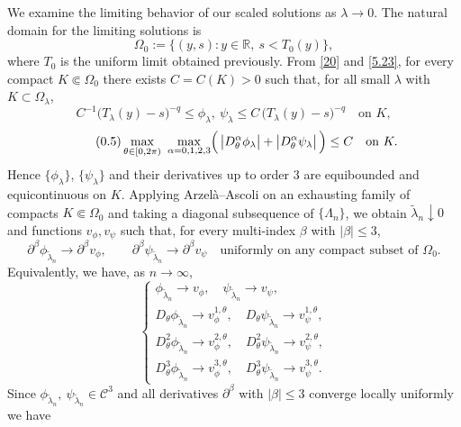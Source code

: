 \documentclass[
  sn-mathphys-num,
  colorlinks,
  linkcolor=darkmagenta,
  citecolor=rufous,
  urlcolor=zaffre,
  hypertexnames=false
]{sn-jnl}
\numberwithin{equation}{section}
\begin{document}
\medskip
We  examine the limiting behavior of our scaled solutions as \(\lambda \to 0\).
The natural domain for the limiting solutions is
$$
\Omega_0 := \{(y,s) : y \in \mathbb{R},\ s < T_0(y)\},
$$
where \(T_0\) is the uniform limit obtained previously.
\medskip
 From \eqref{20} and \eqref{5.23}, for every compact $K\Subset \Omega_0$ there exists $C=C(K)>0$ such that, for all small $\lambda$ with $K\subset \Omega_\lambda$,
\begin{equation}\tag{0.4}
C^{-1}\bigl(T_\lambda(y)-s\bigr)^{-q}\le \phi_\lambda,\ \psi_\lambda \le
C\,\bigl(T_\lambda(y)-s\bigr)^{-q}\quad \text{on }K,
\end{equation}
\begin{equation}\tag{0.5}
\max_{\theta\in[0,2\pi)}\ \max_{\alpha=0,1,2,3}
\Bigl(\,\bigl|D_\theta^{\alpha}\phi_\lambda\bigr|+\bigl|D_\theta^{\alpha}\psi_\lambda\bigr|\,\Bigr)\le C
\quad \text{on }K.
\end{equation}
Hence $\{\phi_\lambda\}$, $\{\psi_\lambda\}$ and their derivatives up to order $3$ are equibounded and equicontinuous on $K$. Applying Arzelà--Ascoli on an exhausting family of compacts $K\Subset \Omega_0$ and taking a diagonal subsequence of $\{\Lambda_n\}$, we obtain $\tilde\lambda_n\downarrow 0$ and functions $v_\phi, v_\psi$ such that, for every multi-index $\beta$ with $|\beta|\le 3$,
\begin{equation}\tag{0.6}
\partial^\beta \phi_{\tilde\lambda_n}\to \partial^\beta v_\phi,\qquad
\partial^\beta \psi_{\tilde\lambda_n}\to \partial^\beta v_\psi
\quad \text{uniformly on any compact subset of }\Omega_0.
\end{equation}
Equivalently, we have, as $n \to \infty$, 
\begin{equation}\label{eq:4.23}
\begin{cases}
\phi_{\tilde{\lambda}_n} \to v_\phi, \quad \psi_{\tilde{\lambda}_n} \to v_\psi, \\[4pt]
D_\theta\phi_{\tilde{\lambda}_n} \to v_\phi^{1,\theta}, \quad D_\theta\psi_{\tilde{\lambda}_n} \to v_\psi^{1,\theta}, \\[4pt]
D_\theta^2\phi_{\tilde{\lambda}_n} \to v_\phi^{2,\theta}, \quad D_\theta^2\psi_{\tilde{\lambda}_n} \to v_\psi^{2,\theta}, \\[4pt]
D_\theta^3\phi_{\tilde{\lambda}_n} \to v_\phi^{3,\theta}, \quad D_\theta^3\psi_{\tilde{\lambda}_n} \to v_\psi^{3,\theta}.
\end{cases}
\end{equation}
Since $\phi_{\tilde\lambda_n},\ \psi_{\tilde\lambda_n}\in \mathcal{C}^3$ and all derivatives $\partial^\beta$ with $|\beta|\le 3$ converge locally uniformly we have
\end{document}
